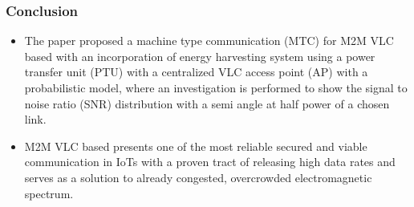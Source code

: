 \documentclass{beamer}
\begin{document}
\begin{frame}
  \frametitle{Conclusion}
  \begin{itemize}
      \item The paper proposed a machine type communication (MTC) for M2M VLC based with an incorporation of energy harvesting system using a power transfer unit (PTU) with a centralized VLC access point (AP) with a probabilistic model, where an investigation is performed to show the signal to noise ratio (SNR) distribution with a semi angle at half power of a chosen link.
      \item M2M VLC based presents one of the most reliable secured and viable communication in IoTs with a proven tract of releasing high data rates and serves as a solution to already congested, overcrowded electromagnetic spectrum.
  \end{itemize}
\end{frame}
\end{document}
